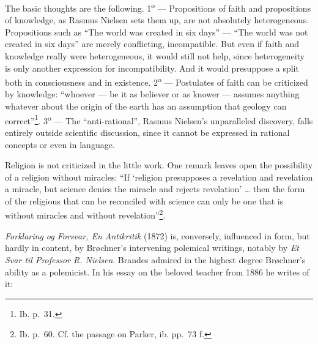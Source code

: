 \documentclass[12pt,a4paper,openany]{book}
\newcommand{\opage}[1]{\marginnote{\footnotesize\textit{[#1]}}}
\begin{document}
The basic thoughts are the following. 1\textsuperscript{o} --- Propositions of faith and propositions of
knowledge, as Rasmus Nielsen sets them up, are not absolutely heterogeneous. Propositions such as ``The world was
created in six days'' --- ``The world was not created in six days'' are merely conflicting, incompatible. But even if
faith and knowledge really were heterogeneous, it would still not help, since heterogeneity is only another
expression for incompatibility. And it
\opage{160}\setcounter{footnote}{0}%
would presuppose a split both in consciousness and in existence. 2\textsuperscript{o} --- Postulates of faith can
be criticized by knowledge: ``whoever --- be it as believer or as knower --- assumes anything whatever about the
origin of the earth has an assumption that geology can correct''\footnote{Ib. p.~31.}. 3\textsuperscript{o} --- The
``anti-rational'', Rasmus Nielsen's unparalleled discovery, falls entirely outside scientific discussion, since it
cannot be expressed in rational concepts or even in language.

Religion is not criticized in the little work. One remark leaves open the possibility of a religion without
miracles: ``If `religion presupposes a revelation and revelation a miracle, but science denies the miracle and
rejects revelation' \dots{} then the form of the religious that can be reconciled with science can only be one that
is without miracles and without revelation''\footnote{Ib. p.~60. Cf. the passage on Parker, ib. pp.~73 f.}.

\textit{Forklaring og Forsvar, En Antikritik} (1872) is, conversely, influenced in form, but hardly in content, by
Brøchner's intervening polemical writings, notably by \textit{Et Svar til Professor R. Nielsen}. Brandes admired in
the highest degree Brøchner's ability as a polemicist. In his essay on the beloved teacher from 1886 he writes of
it:

\medskip
\end{document}
